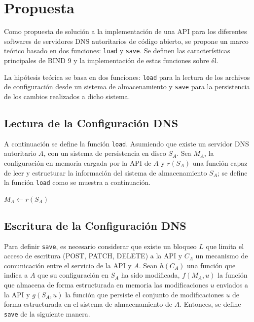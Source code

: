 \chapter{Propuesta}\label{chapter:proposal}

Como propuesta de solución a la implementación de una API para los diferentes softwares de servidores DNS autoritarios de código abierto, se propone un marco teórico basado en dos funciones: \verb+load+ y \verb+save+. Se definen las características principales de BIND 9 y la implementación de estas funciones sobre él.

La hipótesis teórica se basa en dos funciones: \verb+load+ para la lectura de los archivos de configuración desde un sistema de almacenamiento y \verb+save+ para la persistencia de los cambios realizados a dicho sistema.

\section{Lectura de la Configuración DNS}

A continuación se define la función \verb+load+. Asumiendo que existe un servidor DNS autoritario $A$, con un sistema de persistencia en disco $S_A$. Sea $M_A$, la configuración en memoria cargada por la API de $A$ y $r(S_A)$ una función capaz de leer y estructurar la información del sistema de almacenamiento $S_A$; se define la función \verb+load+ como se muestra a continuación.

\begin{algorithmic}
    \State $M_A \leftarrow r(S_A)$
\EndProcedure
\end{algorithmic}

\section{Escritura de la Configuración DNS}

Para definir \verb+save+, es necesario considerar que existe un bloqueo $L$ que limita el acceso de escritura (POST, PATCH, DELETE) a la API y $C_A$ un mecanismo de comunicación entre el servicio de la API y $A$. Sean $h(C_A)$ una función que indica a $A$ que su configuración en $S_A$ ha sido modificada, $f(M_A, u)$ la función que almacena de forma estructurada en memoria las modificaciones $u$ enviados a la API y $g(S_A, u)$ la función que persiste el conjunto de modificaciones $u$ de forma estructurada en el sistema de almacenamiento de $A$. Entonces, se define \verb+save+ de la siguiente manera.

